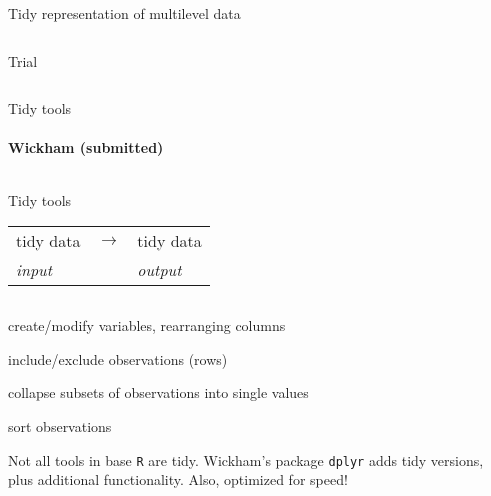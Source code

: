 \documentclass[presentation]{beamer}
\begin{document}
\begin{frame}[label={sec:orgdf48c7e}]{Tidy representation of multilevel data}
\begin{columns}
\begin{column}{.7\columnwidth}
\begin{block}{Trial}
\begin{scriptsize}
\end{scriptsize}
\end{block}
\end{column}
\end{columns}
\end{frame}



\begin{frame}[fragile,label={sec:orgc14ae03}]{Tidy tools}
 \framesubtitle{Wickham (submitted)}

\begin{columns}
\begin{column}{.5\columnwidth}
\begin{block}{Tidy tools}
\begin{center}
\begin{tabular}{lll}
tidy data & \(\rightarrow\) & tidy data\\
\emph{input} &  & \emph{output}\\
\end{tabular}
\end{center}
\end{block}
\end{column}
\end{columns}

\begin{description}[transforming]
  \item[transform] create/modify variables, rearranging columns
  \item[filter] include/exclude observations (rows)
  \item[aggregate] collapse subsets of observations into single values
  \item[order] sort observations
\end{description}

Not all tools in base \texttt{R} are tidy. Wickham's package \texttt{dplyr} adds tidy
versions, plus additional functionality. Also, optimized for speed!
\end{frame}
\end{document}
